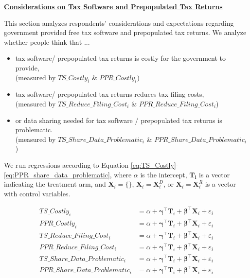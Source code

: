 \documentclass[11pt]{article}
\begin{document}
\begin{center}\textbf{\underline{Considerations on Tax Software and Prepopulated Tax Returns}}\end{center}
This section analyzes respondents’ considerations and expectations regarding government provided free tax software and prepopulated tax returns. We analyze whether people think that ...
\begin{itemize}
    \item tax software/ prepopulated tax returns is costly for the government to provide, \\(measured by $TS\_Costly_i$ \& $PPR\_Costly_i$)
    \item tax software/ prepopulated tax returns reduces tax filing costs, \\(measured by $TS\_Reduce\_Filing\_Cost_i$ \& $PPR\_Reduce\_Filing\_Cost_i$)
    \item or data sharing needed for tax software / prepopulated tax returns is problematic. \\(measured by $TS\_Share\_Data\_Problematic_i$ \& $PPR\_Share\_Data\_Problematic_i$)
\end{itemize}

We run regressions according to Equation \ref{eq:TS_Costly}-\ref{eq:PPR_share_data_problematic}, where $\alpha$ is the intercept, $\mathbf{T_i}$ is a vector indicating the treatment arm, and $\mathbf{X}_{i} = \{\}$, $\mathbf{X}_{i} = \mathbf{X}_{i}^{D}$, or  $\mathbf{X}_{i} = \mathbf{X}_{i}^{R}$ is a vector with control variables. 

\begin{center}
\begin{align}
\label{eq:TS_Costly}
    \text{$TS\_Costly_i$} 
    &= \alpha + \boldsymbol{\gamma}^{\top}\mathbf{T}_i + \boldsymbol{\beta}^{\top}\mathbf{X}_{i} + \varepsilon_{i} \\[0.25em]
    \text{$PPR\_Costly_i$} 
    &= \alpha + \boldsymbol{\gamma}^{\top}\mathbf{T}_i + \boldsymbol{\beta}^{\top}\mathbf{X}_{i} + \varepsilon_{i} \\[0.5em]
    \text{$TS\_Reduce\_Filing\_Cost_i$} 
    &= \alpha + \boldsymbol{\gamma}^{\top}\mathbf{T}_i + \boldsymbol{\beta}^{\top}\mathbf{X}_{i} +  \varepsilon_{i} \\[0.25em]
    \text{$PPR\_Reduce\_Filing\_Cost_i$} 
    &= \alpha + \boldsymbol{\gamma}^{\top}\mathbf{T}_i + \boldsymbol{\beta}^{\top}\mathbf{X}_{i} +  \varepsilon_{i} \\[0.5em]
    \text{$TS\_Share\_Data\_Problematic_i$} 
    &= \alpha + \boldsymbol{\gamma}^{\top}\mathbf{T}_i + \boldsymbol{\beta}^{\top}\mathbf{X}_{i} + \varepsilon_{i} \\[0.25em]
\label{eq:PPR_share_data_problematic}
    \text{$PPR\_Share\_Data\_Problematic_i$} 
    &= \alpha + \boldsymbol{\gamma}^{\top}\mathbf{T}_i + \boldsymbol{\beta}^{\top}\mathbf{X}_{i} + \varepsilon_{i} 
\end{align}
\end{center}
\end{document}
